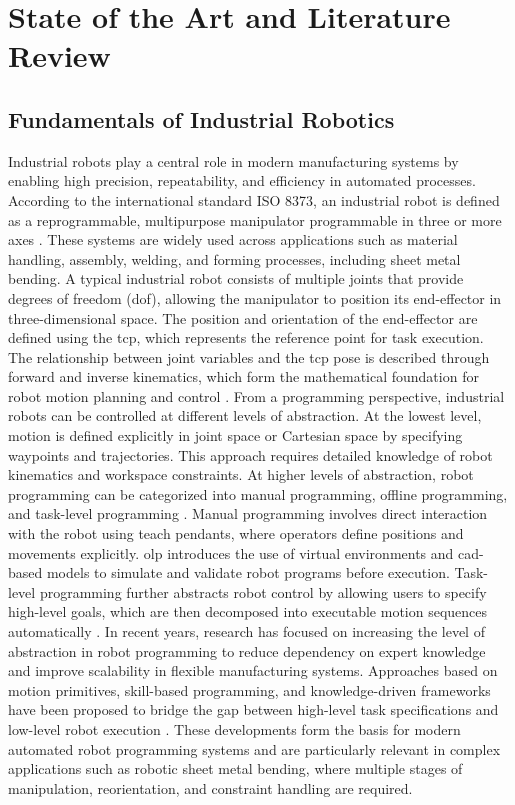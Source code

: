\chapter{State of the Art and Literature Review}
\label{ch:state-of-art}

\section{Fundamentals of Industrial Robotics}
\label{sec:fundamentals-industrial-robotics}

Industrial robots play a central role in modern manufacturing systems by enabling high precision, repeatability, and efficiency in automated processes. According to the international standard ISO 8373, an industrial robot is defined as a reprogrammable, multipurpose manipulator programmable in three or more axes \cite{ISO8373}. These systems are widely used across applications such as material handling, assembly, welding, and forming processes, including sheet metal bending.
A typical industrial robot consists of multiple joints that provide degrees of freedom (\acs{dof}), allowing the manipulator to position its end-effector in three-dimensional space. The position and orientation of the end-effector are defined using the \ac{tcp}, which represents the reference point for task execution. The relationship between joint variables and the \ac{tcp} pose is described through forward and inverse kinematics, which form the mathematical foundation for robot motion planning and control \cite{craig2005robotics}.
From a programming perspective, industrial robots can be controlled at different levels of abstraction. At the lowest level, motion is defined explicitly in joint space or Cartesian space by specifying waypoints and trajectories. This approach requires detailed knowledge of robot kinematics and workspace constraints. At higher levels of abstraction, robot programming can be categorized into manual programming, offline programming, and task-level programming \cite{Siciliano2016Robotics}.
Manual programming involves direct interaction with the robot using teach pendants, where operators define positions and movements explicitly. \ac{olp} introduces the use of virtual environments and \acs{cad}-based models to simulate and validate robot programs before execution. Task-level programming further abstracts robot control by allowing users to specify high-level goals, which are then decomposed into executable motion sequences automatically \cite{LozanoPerez1983}.
In recent years, research has focused on increasing the level of abstraction in robot programming to reduce dependency on expert knowledge and improve scalability in flexible manufacturing systems. Approaches based on motion primitives, skill-based programming, and knowledge-driven frameworks have been proposed to bridge the gap between high-level task specifications and low-level robot execution \cite{Kruger2019}.
These developments form the basis for modern automated robot programming systems and are particularly relevant in complex applications such as robotic sheet metal bending, where multiple stages of manipulation, reorientation, and constraint handling are required.

